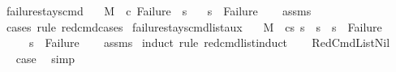 \begin{isabellebody}
%
\isadelimproof
\isanewline
%
\endisadelimproof
\isanewline
{}\isamarkupfalse%
\ failure{\isacharunderscore}{\kern0pt}stays{\isacharunderscore}{\kern0pt}cmd{\isacharcolon}{\kern0pt}\isanewline
\ \ \ {\isachardoublequoteopen}M{\isacharcomma}{\kern0pt}{\isasymLambda}{\isacharcomma}{\kern0pt}{\isasymGamma}{\isacharcomma}{\kern0pt}{\isasymOmega}\ {\isasymturnstile}\ {\isasymlangle}c{\isacharcomma}{\kern0pt}\ Failure{\isasymrangle}\ {\isasymrightarrow}\ s{\isacharprime}{\kern0pt}{\isachardoublequoteclose}\isanewline
\ \ \ {\isachardoublequoteopen}s{\isacharprime}{\kern0pt}\ {\isacharequal}{\kern0pt}\ Failure{\isachardoublequoteclose}\isanewline
%
\isadelimproof
\ \ %
\endisadelimproof
%
\isatagproof
{}\isamarkupfalse%
\ assms\isanewline
\ \ \isamarkupfalse%
\ {\isacharparenleft}{\kern0pt}cases\ rule{\isacharcolon}{\kern0pt}\ red{\isacharunderscore}{\kern0pt}cmd{\isachardot}{\kern0pt}cases{\isacharparenright}{\kern0pt}%
\endisatagproof
{\isafoldproof}%
%
\isadelimproof
\isanewline
%
\endisadelimproof
\isanewline
{}\isamarkupfalse%
\ failure{\isacharunderscore}{\kern0pt}stays{\isacharunderscore}{\kern0pt}cmd{\isacharunderscore}{\kern0pt}list{\isacharunderscore}{\kern0pt}aux{\isacharcolon}{\kern0pt}\isanewline
\ \ \ {\isachardoublequoteopen}M{\isacharcomma}{\kern0pt}{\isasymLambda}{\isacharcomma}{\kern0pt}{\isasymGamma}{\isacharcomma}{\kern0pt}{\isasymOmega}\ {\isasymturnstile}\ {\isasymlangle}cs{\isacharcomma}{\kern0pt}\ s{\isasymrangle}\ {\isacharbrackleft}{\kern0pt}{\isasymrightarrow}{\isacharbrackright}{\kern0pt}\ s{\isacharprime}{\kern0pt}{\isachardoublequoteclose}\ \ {\isachardoublequoteopen}s\ {\isacharequal}{\kern0pt}\ Failure{\isachardoublequoteclose}\isanewline
\ \ \ \ \ {\isachardoublequoteopen}s{\isacharprime}{\kern0pt}\ {\isacharequal}{\kern0pt}\ Failure{\isachardoublequoteclose}\isanewline
%
\isadelimproof
\ \ %
\endisadelimproof
%
\isatagproof
{}\isamarkupfalse%
\ assms\isanewline
{}\isamarkupfalse%
\ {\isacharparenleft}{\kern0pt}induct\ rule{\isacharcolon}{\kern0pt}\ red{\isacharunderscore}{\kern0pt}cmd{\isacharunderscore}{\kern0pt}list{\isachardot}{\kern0pt}induct{\isacharparenright}{\kern0pt}\isanewline
\ \ \isamarkupfalse%
\ RedCmdListNil\isanewline
\ \ \isamarkupfalse%
\ \isamarkupfalse%
\ {\isacharquery}{\kern0pt}case\ \isamarkupfalse%
\ simp\isanewline

\end{isabellebody}
